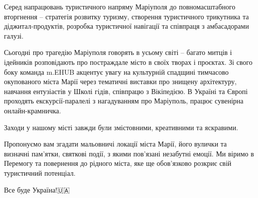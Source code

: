 Серед напрацювань туристичного напряму Маріуполя до повномасштабного вторгнення
– стратегія розвитку туризму, створення туристичного трикутника та
діджитал-продуктів, розробка туристичної навігації та співпраця з амбасадорами
галузі. 

Сьогодні про трагедію Маріуполя говорять в усьому світі – багато митців і
ідейників розповідають про постраждале місто в своїх творах і проєктах. Зі
свого боку команда m.EHUB акцентує увагу на культурній спадщині тимчасово
окупованого міста Марії через тематичні виставки про знищену архітектуру,
навчання ентузіастів у Школі гідів, співпрацю з Вікіпедією. В Україні та Європі
проходять екскурсії-паралелі з нагадуванням про Маріуполь, працює сувенірна
онлайн-крамничка. 

Заходи у нашому місті завжди були змістовними, креативними та яскравими. 

Пропонуємо вам згадати мальовничі локації міста Марії, його вулички та визначні
пам'ятки, святкові події, з якими пов'язані незабутні емоції. Ми віримо в
Перемогу та повернення до рідного міста, яке ще обов'язково розкриє свій
туристичний потенціал. 

Все буде Україна!🇺🇦

